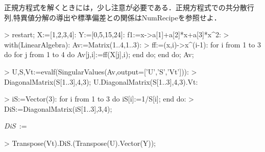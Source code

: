 正規方程式を解くときには，少し注意が必要である．正規方程式での共分散行列,特異値分解の導出や標準偏差との関係はNumRecipeを参照せよ．
\begin{MapleInput}
> restart; X:=[1,2,3,4]: Y:=[0,5,15,24]: f1:=x->a[1]+a[2]*x+a[3]*x^2:
> with(LinearAlgebra): Av:=Matrix(1..4,1..3):
> ff:=(x,i)->x^(i-1): 
  for i from 1 to 3 do 
    for j from 1 to 4 do
      Av[j,i]:=ff(X[j],i); 
    end do; 
  end do; 
  Av;
\end{MapleInput}
\begin{MapleOutput}
\end{MapleOutput}

\begin{MapleInput}
> U,S,Vt:=evalf(SingularValues(Av,output=['U','S','Vt'])):
> DiagonalMatrix(S[1..3],4,3); U.DiagonalMatrix(S[1..3],4,3).Vt:
\end{MapleInput}
\begin{MapleOutput}
\end{MapleOutput}

\begin{MapleInput}
> iS:=Vector(3): 
  for i from 1 to 3 do 
    iS[i]:=1/S[i]; 
  end do:
> DiS:=DiagonalMatrix(iS[1..3],3,4);
\end{MapleInput}
\begin{MapleOutput}
{\it DiS}\, := \, 
\end{MapleOutput}

\begin{MapleInput}
> Transpose(Vt).DiS.(Transpose(U).Vector(Y));
\end{MapleInput}
\begin{MapleOutput}
\left[ \begin {array}{c} - 4.50000000198176498\\ 3.20000000035008324\\ 1.00000000040565196\end {array} \right]
\end{MapleOutput}

